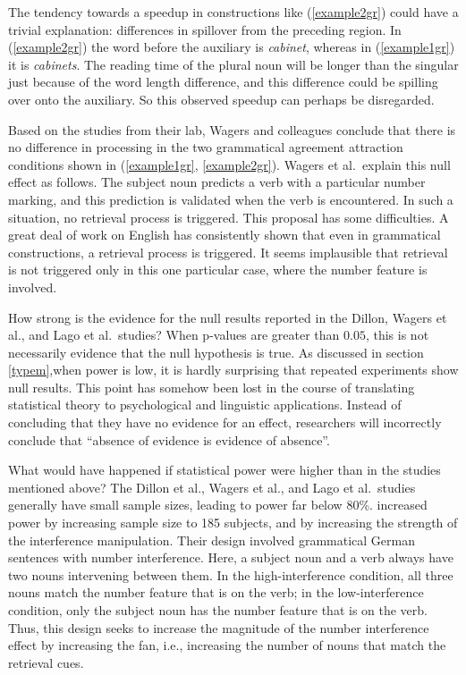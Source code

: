 \documentclass{cambridge7A}\usepackage[]{graphicx}\usepackage[]{color}
\begin{document}
The tendency towards a speedup in constructions like (\ref{example2gr}) could have a trivial explanation: differences in spillover from the preceding region. In (\ref{example2gr}) the word before the auxiliary is \textit{cabinet}, whereas in (\ref{example1gr}) it is  \textit{cabinets}. The reading time of the plural noun will be longer than the singular just because of the word length difference, and this difference could be spilling over onto the auxiliary. So this observed speedup can perhaps be disregarded. 

Based on the studies from their lab, Wagers and colleagues conclude that there is no difference in processing in the two grammatical agreement attraction conditions  shown in  (\ref{example1gr}, \ref{example2gr}). Wagers et al.\ explain this null effect as follows. The subject noun predicts a verb with a particular number marking, and this prediction is validated when the verb is encountered. In such a situation, no retrieval process is triggered.  This proposal has some difficulties. A great deal of work on English \citep{Gibson2000,grodner,Bartek2011} has consistently shown that even in grammatical constructions, a retrieval process is triggered. It seems implausible that retrieval is not triggered only in this one particular case, where the number feature is involved.

How strong is the evidence for the null results reported in the Dillon, Wagers et al., and Lago et al.\ studies? When  p-values are greater than $0.05$, this is not necessarily evidence that the null hypothesis is true. As  discussed in section \ref{typem},when  power is low, it is hardly surprising that repeated experiments show null results. This point has somehow been lost in the course of translating statistical theory to  psychological and linguistic applications. Instead of concluding that they have no evidence for an effect, researchers will incorrectly conclude that ``absence of evidence is evidence of absence''. 

What would have happened if statistical power were higher than in the studies mentioned above? The Dillon et al., Wagers et al., and Lago et al.\  studies generally have small sample sizes, leading to power far below 80\%. 
 \cite{NicenboimEtAlCogSci2018} increased power by increasing sample size to 185 subjects, and by increasing the strength of the interference manipulation. Their design involved grammatical German sentences with number interference. Here, a subject noun and a verb always have two nouns intervening between them. In the high-interference condition, all three nouns match the number  feature that is on the verb; in the low-interference condition, only the subject noun has the number feature that is on the verb. Thus, this design seeks to increase the magnitude of the number interference effect by increasing the  fan, i.e., increasing the number of nouns that match the retrieval cues.
\end{document}
